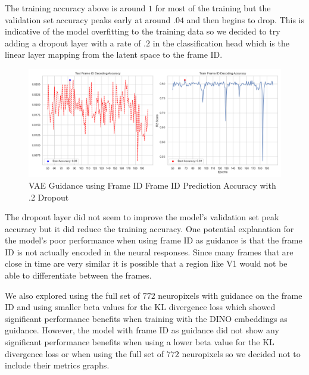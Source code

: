 \documentclass[12pt, letterpaper]{article}
\begin{document}
The training accuracy above is around $1$ for most of the training but the validation set accuracy peaks early at around $.04$ and then begins to drop. This is indicative of the model overfitting to the training data so we decided to try adding a dropout layer with a rate of $.2$ in the classification head which is the linear layer mapping from the latent space to the frame ID. 

\begin{figure}[H]
    \centering
    \includegraphics[width=1.0\textwidth]{frame_id_accuracy_128dim_503_top_var_200_epochs_0.05_beta_2_layer_.2_dropout.png}
    \caption{VAE Guidance using Frame ID Frame ID Prediction Accuracy with .2 Dropout}
    \label{fig:vae_guidance_frame_id_accuracy_dropout}
\end{figure}

The dropout layer did not seem to improve the model's validation set peak accuracy but it did reduce the training accuracy. One potential explanation for the model's poor performance when using frame ID as guidance is that the frame ID is not actually encoded in the neural responses. Since many frames that are close in time are very similar it is possible that a region like V1 would not be able to differentiate between the frames. 

We also explored using the full set of $772$ neuropixels with guidance on the frame ID and using smaller beta values for the KL divergence loss which showed significant performance benefits when training with the DINO embeddings as guidance. However, the model with frame ID as guidance did not show any significant performance benefits when using a lower beta value for the KL divergence loss or when using the full set of $772$ neuropixels so we decided not to include their metrics graphs.
\end{document}
